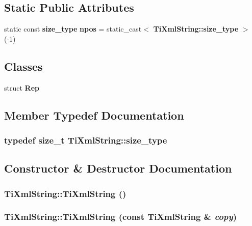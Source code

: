 \subsection*{Static Public Attributes}
\begin{CompactItemize}
\item 
static const {\bf size\_\-type} {\bf npos} = static\_\-cast$<$ {\bf TiXmlString::size\_\-type} $>$(-1)
\end{CompactItemize}
\subsection*{Classes}
\begin{CompactItemize}
\item 
struct \textbf{Rep}
\end{CompactItemize}


\subsection{Member Typedef Documentation}
\subsubsection[size\_\-type]{\setlength{\rightskip}{0pt plus 5cm}typedef size\_\-t {\bf TiXmlString::size\_\-type}}\label{classTiXmlString_beb2c1893a04c17904f7c06546d0b971}




\subsection{Constructor \& Destructor Documentation}
\subsubsection[TiXmlString]{\setlength{\rightskip}{0pt plus 5cm}TiXmlString::TiXmlString ()\hspace{0.3cm}{\tt  [inline]}}\label{classTiXmlString_342f61e0fc2244df300b73aedf6d3fef}


\subsubsection[TiXmlString]{\setlength{\rightskip}{0pt plus 5cm}TiXmlString::TiXmlString (const {\bf TiXmlString} \& {\em copy})\hspace{0.3cm}{\tt  [inline]}}\label{classTiXmlString_c80fe17693a438c9ab2591664743fcb6}




